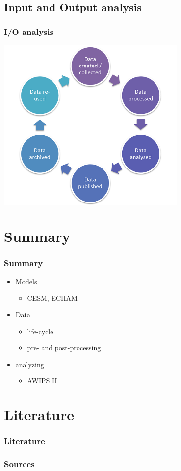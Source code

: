 \documentclass[compress]{beamer}
\begin{document}
\subsection{Input and Output analysis}
\begin{frame}[fragile]
	\frametitle{I/O analysis}
	\begin{center}
	\includegraphics[width=0.7\textwidth]{gfx/DataLifecycle.png}
	\end{center}

\end{frame}


\section{Summary}

\begin{frame}
	\frametitle{Summary}

	\begin{itemize}
		\item Models
		\begin{itemize}
			\item CESM, ECHAM
		\end{itemize}

		\item Data
		\begin{itemize}
			\item life-cycle
			\item pre- and post-processing
		\end{itemize}
		\item analyzing
		\begin{itemize}
		    \item AWIPS II
		\end{itemize}
	\end{itemize}
\end{frame}

\section*{Literature}

\begin{frame}[allowframebreaks]
	\frametitle{Literature}
    \frametitle{Sources}

	
	
\end{frame}
\end{document}
